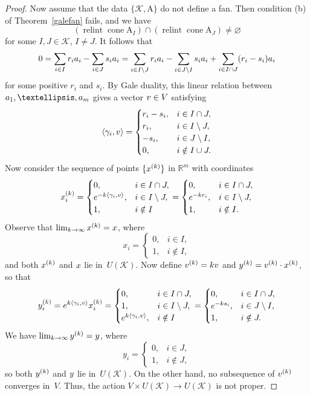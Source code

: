 \documentclass[a4paper]{amsart}
\theoremstyle{definition}
\theoremstyle{remark}
\numberwithin{equation}{section}
\def\R{\mathbb R}
\def\R{\mathbb R}
\def\sK{\mathcal K}
\newcommand{\mb}[1]{{\textbf {\textit#1}}}
\def\cone{\mathop{\mathrm{cone}}}
\def\relint{\mathop{\mathrm{relint}}}
\newcommand{\<}{\langle}
\renewcommand{\>}{\rangle}
\begin{document}
\begin{proof}
\smallskip

Now assume that the data $\{\sK,\mathrm A\}$ do not define a fan. 
Then condition (b) of Theorem~\ref{galefan} fails, and we have
\[
  (\relint\cone\mathrm A_I)\cap(\relint\cone\mathrm A_J)\ne\varnothing
\]
for some $I,J\in\sK$, $I\ne J$.
It follows that
\[
  0=\sum_{i\in I}r_i\mb a_i  -\sum_{i\in J}s_i\mb a_i=
  \sum_{i\in I\setminus J}r_i\mb a_i-\sum_{i\in J\setminus I}s_i\mb a_i+
  \sum_{i\in I\cap J}(r_i-s_i)\mb a_i
\]
for some positive $r_i$ and $s_i$. By Gale duality, this linear relation between $\mb a_1,\ldots,\mb a_m$ gives a vector  $\mb v\in V$ satisfying
\[
  \langle\gamma_i,\mb v\rangle=\begin{cases}
  r_i-s_i,& i\in I\cap J,\\
  r_i,& i\in I\setminus J,   \\
  -s_i,& i\in J\setminus I, \\
  0,& i\notin I\cup J.
  \end{cases}
\]
Now consider the sequence of points $\{\mb x^{(k)}\}$ in $\R^m$ with coordinates
\[
  x^{(k)}_i=\begin{cases}0,&i\in I\cap J,\\
  e^{-k\langle\gamma_i,\mb v\rangle},&i\in I\setminus J,\\1,&i\notin I\end{cases}
  =\begin{cases}0,&i\in I\cap J,\\
  e^{-kr_i},&i\in I\setminus J,\\1,&i\notin I.\end{cases}
\]
Observe that $\lim_{k\to\infty}\mb x^{(k)}=\mb x$, where
\[
  x_i=\begin{cases}0,&i\in I,\\1,&i\notin I,\end{cases}
\]
and both $\mb x^{(k)}$ and $\mb x$ lie in~$U(\sK)$. Now define $\mb v^{(k)}=k\mb v$ and $\mb y^{(k)}=\mb v^{(k)}\cdot\mb x^{(k)}$, so that
\[
  y^{(k)}_i=e^{k\langle\gamma_i,\mb v\rangle}x^{(k)}_i=\begin{cases}0,&i\in I\cap J,\\
  1,&i\in I\setminus J,\\e^{k\langle\gamma_i,\mb v\rangle},&i\notin I\end{cases}
  =\begin{cases}0,&i\in I\cap J,\\
  e^{-ks_i},&i\in J\setminus I,\\1,&i\notin J.\end{cases}
\]
We have $\lim_{k\to\infty}\mb y^{(k)}=\mb y$, where
\[
  y_i=\begin{cases}0,&i\in J,\\1,&i\notin J,\end{cases}
\]
so both $\mb y^{(k)}$ and $\mb y$ lie in~$U(\sK)$. On the other hand, no subsequence of $\mb v^{(k)}$ converges in~$V$. Thus, the action $V\times U(\sK)\to U(\sK)$ is not proper.


\end{proof}
\end{document}
